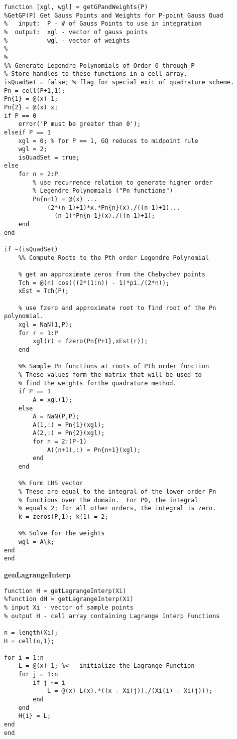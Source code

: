 \begin{lstlisting}[style=myMatlab,name=lec34n-ex2]
function [xgl, wgl] = getGPandWeights(P)
%GetGP(P) Get Gauss Points and Weights for P-point Gauss Quad
%   input:  P - # of Gauss Points to use in integration
%  output:  xgl - vector of gauss points
%           wgl - vector of weights
%
%
%% Generate Legendre Polynomials of Order 0 through P
% Store handles to these functions in a cell array.
isQuadSet = false; % flag for special exit of quadrature scheme.
Pn = cell(P+1,1);
Pn{1} = @(x) 1;
Pn{2} = @(x) x;
if P == 0
    error('P must be greater than 0');
elseif P == 1
    xgl = 0; % for P == 1, GQ reduces to midpoint rule 
    wgl = 2;
    isQuadSet = true;
else
    for n = 2:P
        % use recurrence relation to generate higher order 
        % Legendre Polynomials ("Pn functions")
        Pn{n+1} = @(x) ...
            (2*(n-1)+1)*x.*Pn{n}(x)./((n-1)+1)...
            - (n-1)*Pn{n-1}(x)./((n-1)+1);
    end
end

if ~(isQuadSet)
    %% Compute Roots to the Pth order Legendre Polynomial
    
    % get an approximate zeros from the Chebychev points
    Tch = @(n) cos(((2*(1:n)) - 1)*pi./(2*n));
    xEst = Tch(P);
    
    % use fzero and approximate root to find root of the Pn polynomial.
    xgl = NaN(1,P);
    for r = 1:P
        xgl(r) = fzero(Pn{P+1},xEst(r));
    end
    
    %% Sample Pn functions at roots of Pth order function
    % These values form the matrix that will be used to 
    % find the weights forthe quadrature method.
    if P == 1
        A = xgl(1);
    else
        A = NaN(P,P);
        A(1,:) = Pn{1}(xgl);
        A(2,:) = Pn{2}(xgl);
        for n = 2:(P-1)
            A((n+1),:) = Pn{n+1}(xgl);
        end
    end
    
    %% Form LHS vector
    % These are equal to the integral of the lower order Pn 
    % functions over the domain.  For P0, the integral 
    % equals 2; for all other orders, the integral is zero.
    k = zeros(P,1); k(1) = 2;
    
    %% Solve for the weights
    wgl = A\k;
end
end
\end{lstlisting}

\vspace{0.5cm}

\noindent\textbf{genLagrangeInterp}

\begin{lstlisting}[style=myMatlab,name=lec34n-ex2]
function H = getLagrangeInterp(Xi)
%function dH = getLagrangeInterp(Xi)
% input Xi - vector of sample points
% output H - cell array containing Lagrange Interp Functions

n = length(Xi);
H = cell(n,1);

for i = 1:n
    L = @(x) 1; %<-- initialize the Lagrange Function
    for j = 1:n
        if j ~= i
            L = @(x) L(x).*((x - Xi(j))./(Xi(i) - Xi(j)));
        end
    end
    H{i} = L;
end
end
\end{lstlisting}

